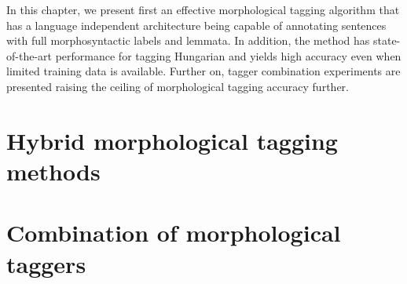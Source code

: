 In this chapter, we present first an effective morphological tagging algorithm that has a language independent architecture being capable of annotating sentences with full morphosyntactic labels and lemmata. 
In addition, the method has state-of-the-art performance for tagging Hungarian and yields high accuracy even when limited training data is available. 
Further on, tagger combination experiments are presented raising the ceiling of morphological tagging accuracy further. 

\section{Hybrid morphological tagging methods}\label{sec:tagging}



\section{Combination of morphological taggers}\label{sec:combination}


 
